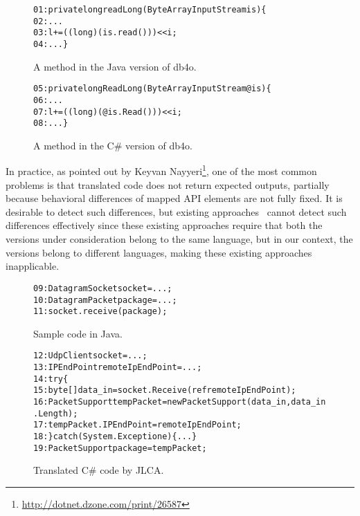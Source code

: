 \begin{figure}[t]
\begin{CodeOut}%
\begin{alltt}
01: private long readLong(ByteArrayInputStream is)\{
02:  ...
03:  l += ((long) (is.read())) << i;
04:  ...\}
\end{alltt}
\end{CodeOut}\vspace*{-4ex}
\caption{A method in the Java version of db4o.}%
\label{fig:db4ojava}
\begin{CodeOut}%
\begin{alltt}
05: private long ReadLong(ByteArrayInputStream @is)\{
06:  ...
07:  l += ((long)(@is.Read())) << i;
08:  ...\}
\end{alltt}
\end{CodeOut}\vspace*{-4ex}
\caption{A method in the C\# version of db4o.}\vspace*{-4ex}
\label{fig:db40net}
\end{figure}

In practice, as pointed out by Keyvan Nayyeri\footnote{\url{http://dotnet.dzone.com/print/26587}}, one of the most common problems is that translated code does not return expected outputs, partially because behavioral differences of mapped API elements are not fully fixed. It is desirable to detect such differences, but existing approaches~\cite{orso1using,jin2010automated} cannot detect such differences effectively since these existing approaches require that both the versions under consideration belong to the same language, but in our context, the versions belong to different languages, making these existing approaches inapplicable.
\begin{figure}[t]
\begin{CodeOut}%
\begin{alltt}
09: DatagramSocket socket = ...;
10: DatagramPacket package = ...;
11: socket.receive(package);
\end{alltt}
\end{CodeOut}\vspace*{-5ex}
\caption{Sample code in Java.}%
\label{fig:javacode}
\begin{CodeOut}%
\begin{alltt}
12: UdpClient socket = ...;
13: IPEndPoint remoteIpEndPoint = ...;
14: try\{
15:  byte[] data_in = socket.Receive(ref remoteIpEndPoint);
16:  PacketSupport tempPacket = new PacketSupport(data_in, data_in.Length);
17:   tempPacket.IPEndPoint = remoteIpEndPoint;
18: \} catch (System.Exception e)\{...\}
19: PacketSupport package = tempPacket;
\end{alltt}
\end{CodeOut}\vspace*{-5ex}
\caption{Translated C\# code by JLCA.}\vspace*{-4ex}
\label{fig:codeJLCA}
\end{figure}

